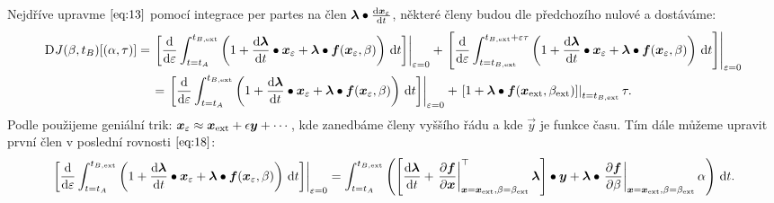 \documentclass[reqno, a4paper]{amsart}
\numberwithin{equation}{section}
\begin{document}
Nejdříve upravme $\eqref{eq:13}$ pomocí integrace per partes na člen $\bm{\lambda} \bullet \frac{\mathrm{d} {\bm{x}_{\varepsilon}}}{\mathrm{d} {t}}$, některé členy budou dle předchozího nulové a dostáváme:
\begin{multline}
  \label{eq:18}
  \mathrm{D}_{} J(\beta, t_{B}) [(\alpha, \tau)]
  =
  \left.
    \left[
      \frac{\mathrm{d} {}}{\mathrm{d} {\varepsilon}}
      \int_{t = t_{A}}^{t_{B, \mathrm{ext}}}
      \left(
        1
        +
        \frac{\mathrm{d} {\bm{\lambda}}}{\mathrm{d} {t}} \bullet \bm{x}_{\varepsilon}
        +
        \bm{\lambda} \bullet \bm{f}(\bm{x}_{\varepsilon}, \beta)
      \right)
      \, \mathrm{d} t
    \right]
  \right|_{\varepsilon = 0}
  +
  \left.
    \left[
      \frac{\mathrm{d} {}}{\mathrm{d} {\varepsilon}}
      \int_{t = t_{B, \mathrm{ext}}}^{t_{B, \mathrm{ext}} + \varepsilon \tau}
      \left(
        1
        +
        \frac{\mathrm{d} {\bm{\lambda}}}{\mathrm{d} {t}} \bullet \bm{x}_{\varepsilon}
        +
        \bm{\lambda} \bullet \bm{f}(\bm{x}_{\varepsilon}, \beta)
      \right)
      \, \mathrm{d} t
    \right]
  \right|_{\varepsilon = 0}
  \\
  =
    \left.
    \left[
      \frac{\mathrm{d} {}}{\mathrm{d} {\varepsilon}}
      \int_{t = t_{A}}^{t_{B, \mathrm{ext}}}
      \left(
        1
        +
        \frac{\mathrm{d} {\bm{\lambda}}}{\mathrm{d} {t}} \bullet \bm{x}_{\varepsilon}
        +
        \bm{\lambda} \bullet \bm{f}(\bm{x}_{\varepsilon}, \beta)
      \right)
      \, \mathrm{d} t
    \right]
  \right|_{\varepsilon = 0}
  +
\left.
    \left[
        1
        +
        \bm{\lambda} \bullet \bm{f}(\bm{x}_{\mathrm{ext}}, \beta_{\mathrm{ext}})
    \right]
  \right|_{t = t_{B, \mathrm{ext}}}
  \tau.
\end{multline}
Podle \citep{prusa.tuma} použijeme geniální trik:
$\bm{x}_{\varepsilon} \approx \bm{x}_{\mathrm{ext}} + \epsilon \bm{y} + \cdots$, kde zanedbáme členy vyššího řádu a kde $\vec{y}$ je funkce času. Tím dále můžeme upravit první člen v poslední rovnosti $\eqref{eq:18}$:
\begin{align}
    \left.
    \left[
      \dd{}{\varepsilon}
      \int_{t = t_{\navstart}}^{t_{\navend, \navext}}
      \left(
        1
        +
        \vectordot{\dd{\greekvec{\lambda}}{t}}{\vec{x}_{\varepsilon}}
        +
        \vectordot{\greekvec{\lambda}}{\vec{f}(\vec{x}_{\varepsilon}, \beta)}
      \right)
      \, \diff t
    \right]
  \right|_{\varepsilon = 0} =  \int_{t = t_{\navstart}}^{t_{\navend, \navext}}
  \left(
    \vectordot{\left[ \dd{\greekvec{\lambda}}{t} + \transpose{\left. \pd{\vec{f}}{\vec{x}} \right|_{\vec{x} = \vec{x}_{\navext}, \beta = \beta_{\navext}}} \greekvec{\lambda} \right]}{\vec{y}}
    +
    \vectordot{\greekvec{\lambda}}
    {
      \left. \pd{\vec{f}}{\beta} \right|_{\vec{x} = \vec{x}_{\navext}, \beta = \beta_{\navext}} \alpha
    }
  \right)
  \, \diff t.
\end{align}
\end{document}

